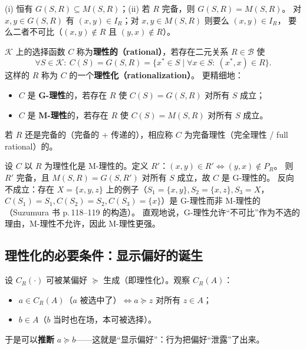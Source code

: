 \begin{remark}\label{rem:GM}
(i) 恒有 $G(S,R)\subseteq M(S,R)$；(ii) 若 $R$ 完备，则 $G(S,R)=M(S,R)$。
对 $x,y\in G(S,R)$ 有 $(x,y)\in I_R$；对 $x,y\in M(S,R)$ 则要么 $(x,y)\in I_R$，
要么二者不可比（$(x,y)\notin R$ 且 $(y,x)\notin R$）。
\end{remark}

\begin{definition}[理性化、G-理性、M-理性]\label{def:rationalize}
$\mathcal{K}$ 上的选择函数 $C$ 称为\textbf{理性的（rational）}，若存在二元关系 $R\in\mathcal{B}$ 使
\[
\forall S\in\mathcal{K}:\ C(S)=G(S,R)=\{x^*\in S\mid \forall x\in S:\ (x^*,x)\in R\}.
\]
这样的 $R$ 称为 $C$ 的一个\textbf{理性化（rationalization）}。
更精细地：
\begin{itemize}
  \item[(a)] $C$ 是 \textbf{G-理性}的，若存在 $R$ 使 $C(S)=G(S,R)$ 对所有 $S$ 成立；
  \item[(b)] $C$ 是 \textbf{M-理性}的，若存在 $R$ 使 $C(S)=M(S,R)$ 对所有 $S$ 成立。
\end{itemize}
若 $R$ 还是完备的（完备的 + 传递的），相应称 $C$ 为完备理性（完全理性 / full rational）的。
\end{definition}

\begin{remark}\label{rem:MG}
设 $C$ 以 $R$ 为理性化是 M-理性的。定义 $R'$：$(x,y)\in R' \iff (y,x)\notin P_R$。
则 $R'$ 完备，且 $M(S,R)=G(S,R')$ 对所有 $S$ 成立，故 $C$ 是 G-理性的。
反向不成立：存在 $X=\{x,y,z\}$ 上的例子（$S_1=\{x,y\},S_2=\{x,z\},S_3=X$，
$C(S_1)=S_1,C(S_2)=S_2,C(S_3)=\{x\}$）是 G-理性而非 M-理性的（Suzumura 书 p.\,118--119 的构造）。
直观地说，G-理性允许“不可比”作为不选的理由，M-理性不允许，因此 M-理性更强。
\end{remark}

\subsection{理性化的必要条件：显示偏好的诞生}

设 $C_R(\cdot)$ 可被某偏好 $\succeq$ 生成（即理性化）。观察 $C_R(A)$：
\begin{itemize}
  \item $a\in C_R(A)$（$a$ 被选中了）$\iff a\succeq z$ 对所有 $z\in A$；
  \item $b\in A$（$b$ 当时也在场，本可被选择）。
\end{itemize}
于是可以\textbf{推断} $a\succeq b$——这就是“显示偏好”：行为把偏好“泄露”了出来。

